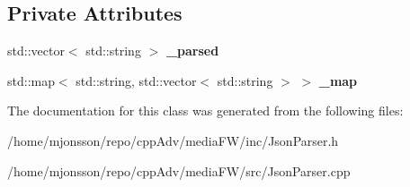 \subsection*{Private Attributes}
\begin{DoxyCompactItemize}
\item 
\mbox{\label{classJsonParser_a9f6f40a24df6f47c7d44bda36373f7d9}} 
std\+::vector$<$ std\+::string $>$ {\bfseries \+\_\+parsed}
\item 
\mbox{\label{classJsonParser_afbc560e458757815191a668619a03b0e}} 
std\+::map$<$ std\+::string, std\+::vector$<$ std\+::string $>$ $>$ {\bfseries \+\_\+map}
\end{DoxyCompactItemize}


The documentation for this class was generated from the following files\+:\begin{DoxyCompactItemize}
\item 
/home/mjonsson/repo/cpp\+Adv/media\+F\+W/inc/Json\+Parser.\+h\item 
/home/mjonsson/repo/cpp\+Adv/media\+F\+W/src/Json\+Parser.\+cpp\end{DoxyCompactItemize}
